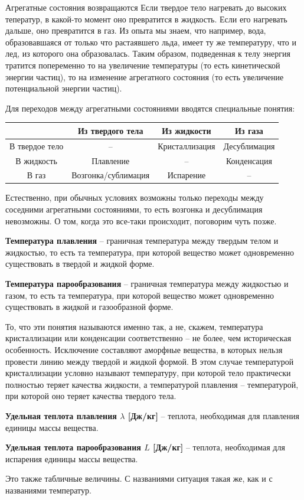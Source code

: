 \documentclass{article}
\newcommand{\definition}[2]{\begin{samepage} \textbf{#1} -- #2. \end{samepage} \par}
\begin{document}
	\begin{section}{Агрегатные состояния возвращаются}
		Если твердое тело нагревать до высоких теператур, в какой-то момент оно превратится в жидкость. Если его нагревать дальше, оно превратится в газ. Из опыта мы знаем, что например, вода, образовавшаяся от только что растаявшего льда, имеет ту же температуру, что и лед, из которого она образовалась. Таким образом, подведенная к телу энергия тратится попеременно то на увеличение температуры (то есть кинетической энергии частиц), то на изменение агрегатного состояния (то есть увеличение потенциальной энергии частиц).

		Для переходов между агрегатными состояниями вводятся специальные понятия:

		\def\arraystretch{2.5}
		\begin{tabular}{c|c|c|c}
			& Из твердого тела & Из жидкости & Из газа \\ \hline
			В твердое тело & -- & Кристаллизация & Десублимация \\
			В жидкость & Плавление & -- & Конденсация \\
			В газ & Возгонка/сублимация & Испарение & --
		\end{tabular}

		Естественно, при обычных условиях возможны только переходы между соседними агрегатными состояниями, то есть возгонка и десублимация невозможны. О том, когда это все-таки происходит, поговорим чуть позже.

		\definition{Температура плавления}{граничная температура между твердым телом и жидкостью, то есть та температура, при которой вещество может одновременно существовать в твердой и жидкой форме}

		\definition{Температура парообразования}{граничная температура между жидкостью и газом, то есть та температура, при которой вещество может одновременно существовать в жидкой и газообразной форме}

		То, что эти понятия называются именно так, а не, скажем, температура кристаллизации или конденсации соответственно -- не более, чем историческая особенность. Исключение составляют аморфные вещества, в которых нельзя провести линию между твердой и жидкой формой. В этом случае температурой кристаллизации условно называют температуру, при которой тело практически полностью теряет качества жидкости, а температурой плавления -- температурой, при которой оно теряет качества твердого тела.

		\definition{Удельная теплота плавления $\lambda$ [Дж/кг]}{теплота, необходимая для плавления единицы массы вещества}

		\definition{Удельная теплота парообразования $L$ [Дж/кг]}{теплота, необходимая для испарения единицы массы вещества}

		Это также табличные величины. С названиями ситуация такая же, как и с названиями температур.
	\end{section}
\end{document}
